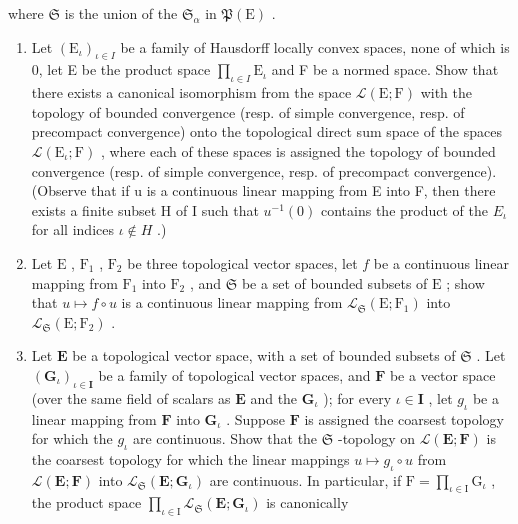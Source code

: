 where \(\mathfrak{S}\) is the union of the \(\mathfrak{S}_{\alpha}\) in \(\mathfrak{P}(\mathrm{E})\) .

\begin{enumerate}
\def\labelenumi{\arabic{enumi})}
\setcounter{enumi}{5}
\item
  Let \((\mathrm{E}_{\iota})_{\iota \in I}\) be a family of Hausdorff locally convex spaces, none of which is 0, let E be the product space \(\prod_{\iota \in I} \mathrm{E}_{\iota}\) and F be a normed space. Show that there exists a canonical isomorphism from the space \(\mathcal{L}(\mathrm{E};\mathrm{F})\) with the topology of bounded convergence (resp. of simple convergence, resp. of precompact convergence) onto the topological direct sum space of the spaces \(\mathcal{L}(\mathrm{E}_{\iota};\mathrm{F})\) , where each of these spaces is assigned the topology of bounded convergence (resp. of simple convergence, resp. of precompact convergence). (Observe that if u is a continuous linear mapping from E into F, then there exists a finite subset H of I such that \(u^{-1}(0)\) contains the product of the \(E_{\iota}\) for all indices \(\iota\notin H\) .)
\item
  Let \(\mathrm{E}\) , \(\mathrm{F}_1\) , \(\mathrm{F}_2\) be three topological vector spaces, let \(f\) be a continuous linear mapping from \(\mathrm{F}_1\) into \(\mathrm{F}_2\) , and \(\mathfrak{S}\) be a set of bounded subsets of \(\mathrm{E}\) ; show that \(u \mapsto f \circ u\) is a continuous linear mapping from \(\mathcal{L}_{\mathfrak{S}}(\mathrm{E};\mathrm{F}_1)\) into \(\mathcal{L}_{\mathfrak{S}}(\mathrm{E};\mathrm{F}_2)\) .
\item
  Let \(\mathbf{E}\) be a topological vector space, with a set of bounded subsets of \(\mathfrak{S}\) . Let \((\mathbf{G}_{\iota})_{\iota \in \mathbf{I}}\) be a family of topological vector spaces, and \(\mathbf{F}\) be a vector space (over the same field of scalars as \(\mathbf{E}\) and the \(\mathbf{G}_{\iota}\) ); for every \(\iota \in \mathbf{I}\) , let \(g_{\iota}\) be a linear mapping from \(\mathbf{F}\) into \(\mathbf{G}_{\iota}\) . Suppose \(\mathbf{F}\) is assigned the coarsest topology for which the \(g_{\iota}\) are continuous. Show that the \(\mathfrak{S}\) -topology on \(\mathcal{L}(\mathbf{E};\mathbf{F})\) is the coarsest topology for which the linear mappings \(u\mapsto g_{\iota}\circ u\) from \(\mathcal{L}(\mathbf{E};\mathbf{F})\) into \(\mathcal{L}_{\mathfrak{S}}(\mathbf{E};\mathbf{G}_{\iota})\) are continuous. In particular, if \(\mathrm{F} = \prod_{\iota \in \mathrm{I}}\mathrm{G}_{\iota}\) , the product space \(\prod_{\iota \in \mathrm{I}}\mathcal{L}_{\mathfrak{S}}(\mathbf{E};\mathbf{G}_{\iota})\) is canonically
\end{enumerate}

